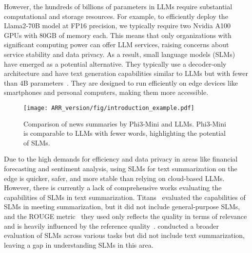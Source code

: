 However, the hundreds of billions of parameters in LLMs require substantial computational and storage resources. For example, to efficiently deploy the Llama2-70B model at FP16 precision, we typically require two Nvidia A100 GPUs with 80GB of memory each. This means that only organizations with significant computing power can offer LLM services, raising concerns about service stability and data privacy. As a result, small language models (SLMs) have emerged as a potential alternative. They typically use a decoder-only architecture and have text generation capabilities similar to LLMs but with fewer than 4B parameters~\cite{azure2024phi,qwen,cai2024internlm2,abdin2024phi3,llama3.2}. They are designed to run efficiently on edge devices like smartphones and personal computers, making them more accessible.




\begin{figure}
    \centering
    \texttt{[image: ARR\_version/fig/introduction\_example.pdf]}
    \caption{Comparison of news summaries by Phi3-Mini and LLMs. Phi3-Mini is comparable to LLMs with fewer words, highlighting the potential of SLMs.  }
    \label{fig:intro}
\end{figure}




Due to the high demands for efficiency and data privacy in areas like financial forecasting and sentiment analysis, using SLMs for text summarization on the edge is quicker, safer, and more stable than relying on cloud-based LLMs. However, there is currently a lack of comprehensive works evaluating the capabilities of SLMs in text summarization. Titans~\cite{tiny_titan} evaluated the capabilities of SLMs in meeting summarization, but it did not include general-purpose SLMs, and the ROUGE metric~\cite{lin-2004-rouge} they used only reflects the quality in terms of relevance and is heavily influenced by the reference quality~\cite{zhang2024benchmarking}. \citet{lu2024smalllanguagemodelssurvey} conducted a broader evaluation of SLMs across various tasks but did not include text summarization, leaving a gap in understanding SLMs in this area.




